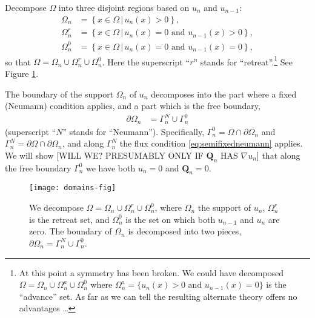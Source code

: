 \documentclass[final,leqno,onefignum,onetabnum]{siamltex1213bueler}
\newcommand\bQ{\mathbf{Q}}
\renewcommand{\grad}{\nabla}
\begin{document}
Decompose $\Omega$ into three disjoint regions based on $u_n$ and $u_{n-1}$:
\begin{align*}
\Omega_n &= \left\{x \in \Omega \,\big|\, u_n(x)>0\right\}, \\
\Omega_n^r &= \left\{x \in \Omega \,\big|\, u_n(x)=0 \text{ and } u_{n-1}(x) > 0\right\}, \\
\Omega_n^0 &= \left\{x \in \Omega \,\big|\, u_n(x)=0 \text{ and } u_{n-1}(x) = 0\right\},
\end{align*}
so that $\Omega = \Omega_n \cup \Omega_n^r \cup \Omega_n^0$.  Here the superscript ``$r$'' stands for ``retreat''.\footnote{At this point a symmetry has been broken.  We could have decomposed $\Omega= \Omega_n \cup \Omega_n^a \cup \Omega_n^0$ where $\Omega_n^a = \{u_n(x) > 0 \text{ and } u_{n-1}(x) = 0\}$ is the ``advance'' set.  As far as we can tell the resulting alternate theory offers no advantages \dots}  See Figure \ref{fig:domains}.

The boundary of the support $\Omega_n$ of $u_n$ decomposes into the part where a fixed (Neumann) condition applies, and a part which is the free boundary,
\begin{align*}
\partial\Omega_n &= \Gamma_n^N \cup \Gamma_n^0
\end{align*}
(superscript ``$N$'' stands for ``Neumann'').  Specifically, $\Gamma_n^0 = \Omega \cap \partial \Omega_n$ and $\Gamma_n^N = \partial \Omega \cap \partial \Omega_n$, and along $\Gamma_n^N$ the flux condition \eqref{eq:semifixedneumann} applies.  We will show [WILL WE?  PRESUMABLY ONLY IF $\bQ_n$ HAS $\grad u_n$] that along the free boundary $\Gamma_n^0$ we have both $u_n=0$ and $\bQ_n = 0$.

\begin{figure}[ht]
\begin{center}
\texttt{[image: domains-fig]}
\end{center}
\caption{We decompose $\Omega = \Omega_n \cup \Omega_n^r \cup \Omega_n^0$, where $\Omega_n$ the support of $u_n$, $\Omega_n^r$ is the retreat set, and $\Omega_n^0$ is the set on which both $u_{n-1}$ and $u_n$ are zero.  The boundary of $\Omega_n$ is decomposed into two pieces, $\partial\Omega_n = \Gamma_n^N \cup \Gamma_n^0$.}
\label{fig:domains}
\end{figure}
\end{document}
